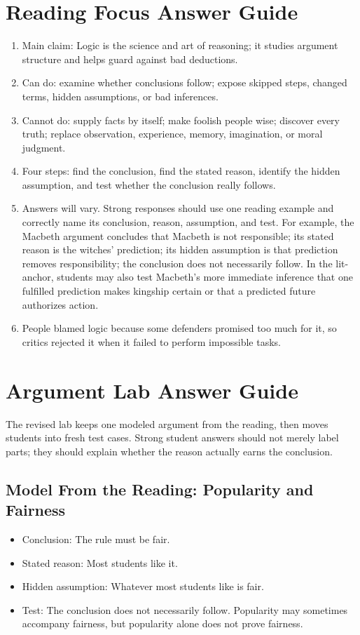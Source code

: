 \documentclass[12pt]{article}
\begin{document}
\section*{Reading Focus Answer Guide}
\begin{enumerate}[leftmargin=*]
\item Main claim: Logic is the science and art of reasoning; it studies argument structure and helps guard against bad deductions.
\item Can do: examine whether conclusions follow; expose skipped steps, changed terms, hidden assumptions, or bad inferences.
\item Cannot do: supply facts by itself; make foolish people wise; discover every truth; replace observation, experience, memory, imagination, or moral judgment.
\item Four steps: find the conclusion, find the stated reason, identify the hidden assumption, and test whether the conclusion really follows.
\item Answers will vary. Strong responses should use one reading example and correctly name its conclusion, reason, assumption, and test. For example, the Macbeth argument concludes that Macbeth is not responsible; its stated reason is the witches' prediction; its hidden assumption is that prediction removes responsibility; the conclusion does not necessarily follow. In the lit-anchor, students may also test Macbeth's more immediate inference that one fulfilled prediction makes kingship certain or that a predicted future authorizes action.
\item People blamed logic because some defenders promised too much for it, so critics rejected it when it failed to perform impossible tasks.
\end{enumerate}

\section*{Argument Lab Answer Guide}
The revised lab keeps one modeled argument from the reading, then moves students into fresh test cases. Strong student answers should not merely label parts; they should explain whether the reason actually earns the conclusion.

\subsection*{Model From the Reading: Popularity and Fairness}
\begin{itemize}[leftmargin=*]
\item Conclusion: The rule must be fair.
\item Stated reason: Most students like it.
\item Hidden assumption: Whatever most students like is fair.
\item Test: The conclusion does not necessarily follow. Popularity may sometimes accompany fairness, but popularity alone does not prove fairness.
\end{itemize}
\end{document}
